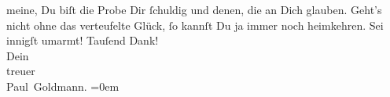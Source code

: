 \begin{ledgroupsized}[t]{13cm}
               meine, Du biſt die Probe Dir ſchuldig und denen, die an Dich glauben. Geht’s
                  nicht\strikeout{,} ohne das verteufelte Glück, ſo kannſt Du ja immer noch
               heimkehren.\pend
           \pstart
           Sei innigſt umarmt! Tauſend Dank! {\\[\baselineskip]}Dein{\\[\baselineskip]}treuer{\\[\baselineskip]}\spacefill\mbox{Paul Goldmann.}\pend
           \leftskip=0em{}
         
         \endnumbering{}\end{ledgroupsized}  \newcommand{\dateiname}{L02699}\newcommand{\titel}{Paul Goldmann an Arthur Schnitzler, 27. 6. [1892]}\newcommand{\editorInnen}{Martin Anton Müller und Laura Untner}
      